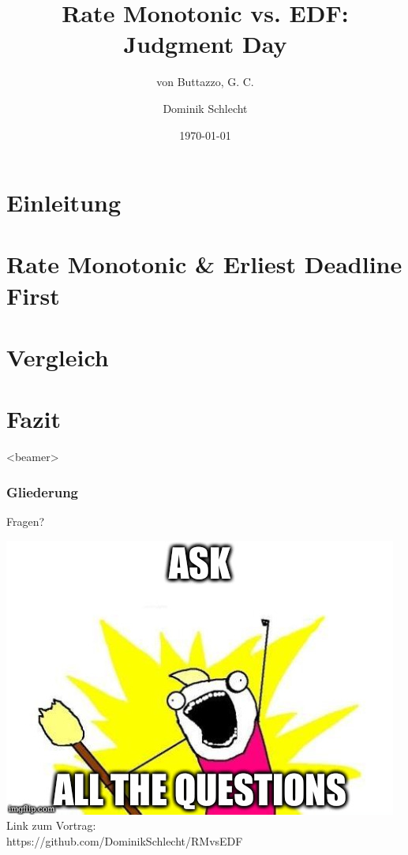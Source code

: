 \documentclass[unknownkeysallowed]{beamer}
\title{Rate Monotonic vs. EDF: Judgment Day}
\subtitle{von Buttazzo, G. C.}
\date{\today}
\author{Dominik Schlecht}
\institute[THI]{Technische Hochschule Ingolstadt}
\newcounter{ct}
\begin{document}
	\frame{\maketitle}
	\frame{\tableofcontents[hideallsubsections]}
	
	
	\section{Einleitung}
	
	
	\section{Rate Monotonic \& Erliest Deadline First}
	
	
	\section{Vergleich}
	
	
	
	\section{Fazit}

	\begin{frame}<beamer>
		\frametitle{Gliederung}
		\tableofcontents[
  			currentsection,
  			sectionstyle=show/show,
  			subsectionstyle=show/shaded/hide,
  			squeeze
		]
	\end{frame}	
	
	
	
\begin{frame}{Fragen?}
	\begin{center}
			\includegraphics[scale=.4]{graphics/memes/ask.jpg}\\[2ex]
			Link zum Vortrag:\\https://github.com/DominikSchlecht/RMvsEDF
	\end{center}
\end{frame}
	
\end{document}
